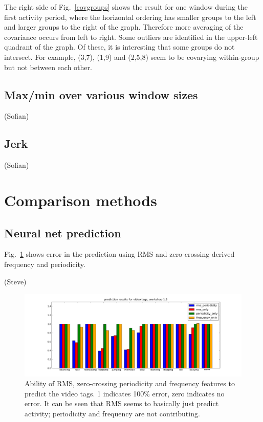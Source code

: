\documentclass{article}
\begin{document}
The right side of Fig.~\ref{covgroups} shows the result for one window
during the first activity period, where the horizontal ordering has
smaller groups to the left and larger groups to the right of the
graph.
Therefore more averaging of the covariance occurs from left to right.
Some outliers are identified in the upper-left quadrant of the graph.
Of these, it is interesting that some groups do not intersect.
For example, (3,7), (1,9) and (2,5,8) seem to be covarying
within-group but not between each other.

\subsection{Max/min over various window sizes}

(Sofian)

\subsection{Jerk}

(Sofian)

\section{Comparison methods}

\subsection{Neural net prediction}

Fig.~\ref{fig:predresults} shows error in the prediction using RMS and
zero-crossing-derived frequency and periodicity.

(Steve)

\begin{figure}
\centerline{\includegraphics[width=\textwidth]{images/predictionresults.png}}
\caption{Ability of RMS, zero-crossing periodicity and frequency
  features to predict the video tags.  1 indicates 100\% error, zero
  indicates no error.  It can be seen that RMS seems to basically just
  predict activity; periodicity and frequency are not contributing.}
\label{fig:predresults}
\end{figure}
\end{document}
